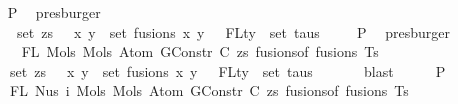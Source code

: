\begin{isabellebody}
\ \ \ \isamarkupfalse%
\ P{}{}\ \isamarkupfalse%
\ presburger\isanewline
\ \ \isamarkupfalse%
\ \isamarkupfalse%
\isanewline
\ \ \ \ {\isachardoublequoteopen}{\isachardot}{\kern0pt}{\isachardot}{\kern0pt}{\isachardot}{\kern0pt}\ {\isacharequal}{\kern0pt}\ set\ zs\ {\isasymunion}\ {\isacharparenleft}{\kern0pt}{\isasymUnion}\ {\isacharparenleft}{\kern0pt}x{\isacharcomma}{\kern0pt}\ y{\isacharparenright}{\kern0pt}\ {\isasymin}\ set\ fusions{\isachardot}{\kern0pt}\ {\isacharbraceleft}{\kern0pt}x{\isacharcomma}{\kern0pt}\ y{\isacharbraceright}{\kern0pt}{\isacharparenright}{\kern0pt}\ {\isasymunion}\ {\isasymUnion}\ {\isacharparenleft}{\kern0pt}FLty\ {\isacharbackquote}{\kern0pt}\ set\ taus{\isacharparenright}{\kern0pt}{\isachardoublequoteclose}\isanewline
\ \ \ \isamarkupfalse%
\ P{}\ \isamarkupfalse%
\ presburger\isanewline
\ \ \isamarkupfalse%
\ \isamarkupfalse%
\isanewline
\ \ \ \ \ {\isachardoublequoteopen}FL\ {\isacharparenleft}{\kern0pt}Mols{}\ {\isacharparenleft}{\kern0pt}Mols{}\ {\isacharparenleft}{\kern0pt}Atom\ {\isacharparenleft}{\kern0pt}GConstr\ C{\isacharparenright}{\kern0pt}\ zs{\isacharparenright}{\kern0pt}\ {\isacharparenleft}{\kern0pt}fusions{\isacharunderscore}{\kern0pt}of\ fusions{\isacharparenright}{\kern0pt}{\isacharparenright}{\kern0pt}\ Ts{\isacharparenright}{\kern0pt}\ {\isacharequal}{\kern0pt}\isanewline
\ \ \ \ \ set\ zs\ {\isasymunion}\ {\isacharparenleft}{\kern0pt}{\isasymUnion}\ {\isacharparenleft}{\kern0pt}x{\isacharcomma}{\kern0pt}\ y{\isacharparenright}{\kern0pt}\ {\isasymin}\ set\ fusions{\isachardot}{\kern0pt}\ {\isacharbraceleft}{\kern0pt}x{\isacharcomma}{\kern0pt}\ y{\isacharbraceright}{\kern0pt}{\isacharparenright}{\kern0pt}\ {\isasymunion}\ {\isasymUnion}\ {\isacharparenleft}{\kern0pt}FLty\ {\isacharbackquote}{\kern0pt}\ set\ taus{\isacharparenright}{\kern0pt}{\isachardoublequoteclose}\isanewline
\ \ \ \ \ \isamarkupfalse%
\ blast\isanewline
\ \ \isamarkupfalse%
\ \isamarkupfalse%
\ P{}{}{\isacharcolon}{\kern0pt}\isanewline
\ \ \ \ \ {\isachardoublequoteopen}FL\ {\isacharparenleft}{\kern0pt}Nus{}\ i\ {\isacharparenleft}{\kern0pt}Mols{}\ {\isacharparenleft}{\kern0pt}Mols{}\ {\isacharparenleft}{\kern0pt}Atom\ {\isacharparenleft}{\kern0pt}GConstr\ C{\isacharparenright}{\kern0pt}\ zs{\isacharparenright}{\kern0pt}\ {\isacharparenleft}{\kern0pt}fusions{\isacharunderscore}{\kern0pt}of\ fusions{\isacharparenright}{\kern0pt}{\isacharparenright}{\kern0pt}\ Ts{\isacharparenright}{\kern0pt}{\isacharparenright}{\kern0pt}\ {\isacharequal}{\kern0pt}\isanewline

\end{isabellebody}
